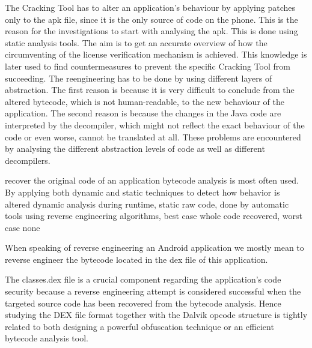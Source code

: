 The Cracking Tool has to alter an application's behaviour by applying patches only to the \gls{apk} file, since it is the only source of code on the phone. This is the reason for the investigations to start with analysing the \gls{apk}. This is done using static analysis tools. The aim is to get an accurate overview of how the circumventing of the license verification mechanism is achieved. This knowledge is later used to find countermeasures to prevent the specific Cracking Tool from succeeding.\newline
The reengineering has to be done by using different layers of abstraction. The first reason is because it is very difficult to conclude from the altered bytecode, which is not human-readable, to the new behaviour of the application. The second reason is because the changes in the Java code are interpreted by the decompiler, which might not reflect the exact behaviour of the code or even worse, cannot be translated at all.\newline
These problems are encountered by analysing the different abstraction levels of code as well as different decompilers.

%
recover the original code of an application bytecode analysis is most
often used. By applying both dynamic and static techniques to detect how behavior is altered\newline
dynamic analysis during runtime, static raw code, done by automatic tools using reverse engineering algorithms, best case whole code recovered, worst case none

When speaking of reverse engineering an Android application we mostly mean to reverse engineer the bytecode located in the dex file of this application.

The classes.dex file is a crucial component regarding the application’s code security because a reverse engineering attempt is considered successful when the targeted source code has been recovered from the bytecode analysis. Hence studying the DEX file format together with the Dalvik opcode structure is tightly related to both designing a powerful obfuscation technique or an efficient bytecode analysis tool.
\cite{kovachevaMaster}
%

